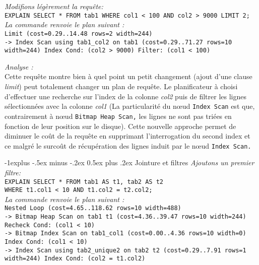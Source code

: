 \documentclass[10pt,landscape, a4paper]{article}
\makeatletter
\renewcommand{\subsection}{\@startsection{subsection}{2}{0mm}%
                                {-1explus -.5ex minus -.2ex}%
                                {0.5ex plus .2ex}%
                                {\normalfont\normalsize\bfseries}}
\makeatother
\begin{document}
\begin{multicols}{3}
\hspace{0.25em} {\scriptsize \emph{Modifions légèrement  la requête:}}\\
\texttt{EXPLAIN SELECT * FROM tab1 WHERE col1 < 100 AND col2 > 9000 LIMIT 2;}\\
\hspace{0.25em} {\scriptsize \emph{La commande renvoie le plan suivant :}}\\
\texttt{Limit  (cost=0.29..14.48 rows=2 width=244)\\ 
	\hspace{0.25em} ->  \textcolor{node}{Index Scan} \textcolor{table}{using tab1\_col2} on tab1  (cost=0.29..71.27 rows=10 width=244) Index Cond: (col2 > 9000) Filter: \textcolor{filter}{(col1 < 100)}}

\hspace{0.25em} {\scriptsize \emph{Analyse :}}\\
{\scriptsize Cette requête montre bien à quel point un petit changement (ajout d'une clause \emph{limit}) peut totalement changer un plan de requête. Le planificateur à choisi d'effectuer \textcolor{node}{une recherche} sur \textcolor{table}{l'index de la colonne \emph{col2}} puis de \textcolor{filter}{filtrer les lignes sélectionnées avec la colonne \emph{col1}} (La particularité \textcolor{node}{du nœud \texttt{Index Scan}} est que, contrairement à nœud \texttt{Bitmap Heap Scan,} les lignes ne sont pas triées en fonction de leur position sur le disque). Cette nouvelle approche permet de diminuer le coût de la requête en supprimant l'interrogation du second index et ce malgré le surcoût de récupération des lignes induit par \textcolor{node}{le nœud \texttt{Index Scan.}}}

\subsection{Jointure et filtres}
\hspace{0.25em} {\scriptsize \emph{Ajoutons un premier filtre:}}\\
\texttt{EXPLAIN SELECT * FROM tab1 AS t1, tab2 AS t2 \\ WHERE t1.col1 < 10 AND t1.col2 = t2.col2;}\\
%
\hspace{0.25em} {\scriptsize \emph{La commande renvoie le plan suivant :}}\\
%
\texttt{\textcolor{node4}{Nested Loop}  (cost=4.65..118.62 rows=10 width=488)\\
	\hspace{0.25em} ->   \textcolor{node2}{Bitmap Heap Scan} on tab1 t1  (cost=4.36..39.47 rows=10 width=244) Recheck Cond:  \textcolor{filter2}{(col1 < 10)} \\
		\hspace{0.75em} ->   \textcolor{node}{Bitmap Index Scan} on tab1\_col1  (cost=0.00..4.36 rows=10 width=0) Index Cond:  \textcolor{filter}{(col1 < 10)}\\
	\hspace{0.25em} ->   \textcolor{node3}{Index Scan} using tab2\_unique2 on \textcolor{table}{tab2} t2  (cost=0.29..7.91 rows=1 width=244) Index Cond: \textcolor{filter3}{(col2 = t1.col2)}}


\end{multicols}
\end{document}
